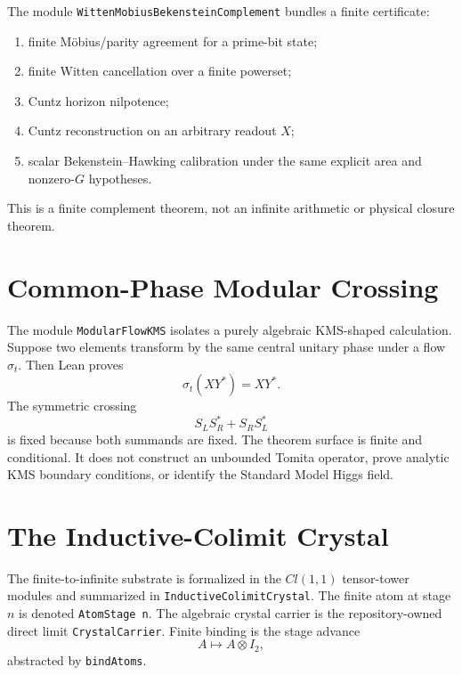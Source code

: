 \documentclass[11pt,a4paper]{article}
\begin{document}
The module \texttt{WittenMobiusBekensteinComplement} bundles a finite
certificate:
\begin{enumerate}
  \item finite Möbius/parity agreement for a prime-bit state;
  \item finite Witten cancellation over a finite powerset;
  \item Cuntz horizon nilpotence;
  \item Cuntz reconstruction on an arbitrary readout $X$;
  \item scalar Bekenstein--Hawking calibration under the same explicit area and
  nonzero-$G$ hypotheses.
\end{enumerate}
This is a finite complement theorem, not an infinite arithmetic or physical
closure theorem.

\section{Common-Phase Modular Crossing}

The module \texttt{ModularFlowKMS} isolates a purely algebraic KMS-shaped
calculation.  Suppose two elements transform by the same central unitary phase
under a flow $\sigma_t$.  Then Lean proves
\begin{equation}
  \sigma_t(XY^*) = XY^*.
\end{equation}
The symmetric crossing
\begin{equation}
  S_L S_R^* + S_R S_L^*
\end{equation}
is fixed because both summands are fixed.  The theorem surface is finite and
conditional.  It does not construct an unbounded Tomita operator, prove analytic
KMS boundary conditions, or identify the Standard Model Higgs field.

\section{The Inductive-Colimit Crystal}

The finite-to-infinite substrate is formalized in the $Cl(1,1)$ tensor-tower
modules and summarized in \texttt{InductiveColimitCrystal}.  The finite atom at
stage $n$ is denoted \texttt{AtomStage n}.  The algebraic crystal carrier is the
repository-owned direct limit \texttt{CrystalCarrier}.  Finite binding is the
stage advance
\begin{equation}
  A \longmapsto A \otimes I_2,
\end{equation}
abstracted by \texttt{bindAtoms}.
\end{document}
